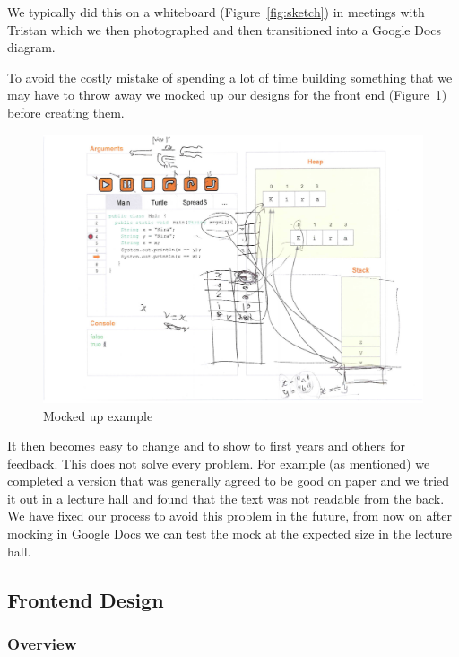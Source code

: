 \documentclass[11pt, a4paper]{article}
\begin{document}
We typically did this on a whiteboard (Figure~\ref{fig:sketch}) in meetings with Tristan which we then photographed and then transitioned into a Google Docs diagram.

To avoid the costly mistake of spending a lot of time building something that we may have to throw away we mocked up our designs for the front end (Figure~\ref{fig:mockup}) before creating them.
\begin{figure}[h!]
\centering
\includegraphics[width=\textwidth]{mockup.png}
\caption{Mocked up example}
\label{fig:mockup}
\end{figure}

It then becomes easy to change and to show to first years and others for feedback. 
This does not solve every problem.
For example (as mentioned) we completed a version that was generally agreed to be good on paper and we tried it out in a lecture hall and found that the text was not readable from the back.
We have fixed our process to avoid this problem in the future, from now on after mocking in Google Docs we can test the mock at the expected size in the lecture hall.
\subsection{Frontend Design}
\subsubsection{Overview}
\end{document}
